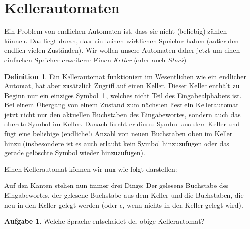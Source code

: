 \documentclass[a4paper,ngerman,12pt]{scrartcl}
\theoremstyle{definition}
\newtheorem{defn}{Definition}[]
\newtheorem{aufg}{Aufgabe}
\theoremstyle{plain}
\theoremstyle{remark}
\begin{document}
\section{Kellerautomaten}

Ein Problem von endlichen Automaten ist, dass sie nicht (beliebig) zählen können. Das liegt daran, dass sie keinen wirklichen Speicher haben (außer den endlich vielen Zuständen). Wir wollen unsere Automaten daher jetzt um einen einfachen Speicher erweitern: Einen \emph{Keller} (oder auch \emph{Stack}).

\begin{defn}
	Ein Kellerautomat funktioniert im Wesentlichen wie ein endlicher Automat, hat aber zusätzlich Zugriff auf einen Keller. Dieser Keller enthält zu Beginn nur ein einziges Symbol $\bot$, welches nicht Teil des Eingabealphabets ist. Bei einem Übergang von einem Zustand zum nächsten liest ein Kellerautomat jetzt nicht nur den aktuellen Buchstaben des Eingabewortes, sondern auch das oberste Symbol im Keller. Danach löscht er dieses Symbol aus dem Keller und fügt eine beliebige (endliche!) Anzahl von neuen Buchstaben oben im Keller hinzu (insbesondere ist es auch erlaubt kein Symbol hinzuzufügen oder das gerade gelöschte Symbol wieder hinzuzufügen).
\end{defn}

Einen Kellerautomat können wir nun wie folgt darstellen:
\begin{center}
\end{center}
Auf den Kanten stehen nun immer drei Dinge: Der gelesene Buchstabe des Eingabewortes, der gelesene Buchstabe aus dem Keller und die Buchstaben, die neu in den Keller gelegt werden (oder $\epsilon$, wenn nichts in den Keller gelegt wird).

\begin{aufg}
	Welche Sprache entscheidet der obige Kellerautomat?
\end{aufg}
\end{document}
